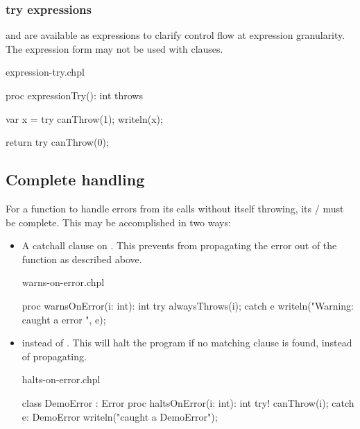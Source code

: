 \subsubsection{try expressions}
\label{try_expressions}

 and  are available as expressions to clarify control flow
at expression granularity. The expression form may not be used with
 clauses.

\begin{chapelexample}{expression-try.chpl}
\begin{chapel}
proc expressionTry(): int throws {
  var x = try canThrow(1);
  writeln(x);

  return try canThrow(0);
}
\end{chapel}
\end{chapelexample}

\subsection{Complete handling}
\label{Complete_handling}

For a function to handle errors from its calls without itself throwing,
its / must be complete. This may be accomplished
in two ways:

\begin{itemize}

\item A catchall clause on . This prevents  from
propagating the error out of the function as described above.

\begin{chapelexample}{warns-on-error.chpl}
\begin{chapel}
proc warnsOnError(i: int): int {
  try {
    alwaysThrows(i);
  } catch e {
    writeln("Warning: caught a error ", e);
  }
}
\end{chapel}
\end{chapelexample}

\item
{} instead of . This will halt the program if no matching
 clause is found, instead of propagating.

\begin{chapelexample}{halts-on-error.chpl}
\begin{chapel}
class DemoError : Error { }
proc haltsOnError(i: int): int {
  try! {
    canThrow(i);
  } catch e: DemoError {
    writeln("caught a DemoError");
  }
}
\end{chapel}
\end{chapelexample}

\end{itemize}


